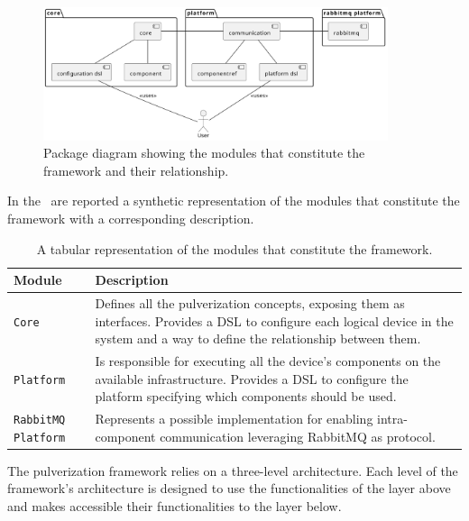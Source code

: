 \begin{figure}[ht]
	\centering
	\includegraphics[width=0.9\textwidth]{figures/package-diagram.pdf}
	\caption{Package diagram showing the modules that constitute the framework and their relationship.}
	\label{fig:package-diagram}
\end{figure}

In the~ are reported a synthetic representation of the modules that constitute the framework with a corresponding
description.

\begin{table}[ht]
	\begin{tabularx}{\textwidth}{l X}
		\toprule
		\textbf{Module}            & \textbf{Description}
		\\ \midrule
		\texttt{Core}              & Defines all the pulverization concepts, exposing them as interfaces.
		Provides a DSL to configure each logical device in the system and a way to define the relationship between them.                              \\
		\texttt{Platform}          & Is responsible for executing all the device's components on the available infrastructure.
		Provides a DSL to configure the platform specifying which components should be used.                                                          \\
		\texttt{RabbitMQ Platform} & Represents a possible implementation for enabling intra-component communication leveraging RabbitMQ as protocol. \\ \bottomrule
	\end{tabularx}
	\caption{A tabular representation of the modules that constitute the framework.}
	\label{tab:framework-modules}
\end{table}

The pulverization framework relies on a three-level architecture. Each level of the framework's architecture is designed to use the functionalities
of the layer above and makes accessible their functionalities to the layer below.

